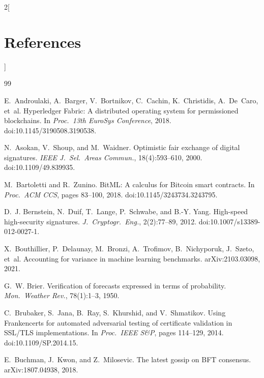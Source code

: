 \documentclass[10pt,a4paper]{article}
\theoremstyle{tight}
\begin{document}
\newpage
{\footnotesize
\setlength{\columnsep}{14pt}\setlength{\premulticols}{0pt}\setlength{\multicolsep}{2pt}
\begin{multicols}{2}[\section*{\large References}]
\renewcommand{\section}[2]{}%
\begin{thebibliography}{99}
\setlength{\itemsep}{0.5pt}\setlength{\parskip}{0pt}

 E.~Androulaki, A.~Barger, V.~Bortnikov, C.~Cachin, K.~Christidis, A.~De~Caro, et~al.
Hyperledger Fabric: A distributed operating system for permissioned blockchains. In \emph{Proc.\ 13th EuroSys
Conference}, 2018. doi:10.1145/3190508.3190538.

 N.~Asokan, V.~Shoup, and M.~Waidner. Optimistic fair exchange of digital signatures.
\emph{IEEE J.\ Sel.\ Areas Commun.}, 18(4):593--610, 2000. doi:10.1109/49.839935.

 M.~Bartoletti and R.~Zunino. BitML: A calculus for Bitcoin smart contracts. In
\emph{Proc.\ ACM CCS}, pages 83--100, 2018. doi:10.1145/3243734.3243795.

 D.~J. Bernstein, N.~Duif, T.~Lange, P.~Schwabe, and B.-Y. Yang. High-speed high-security
signatures. \emph{J.\ Cryptogr.\ Eng.}, 2(2):77--89, 2012. doi:10.1007/s13389-012-0027-1.

 X.~Bouthillier, P.~Delaunay, M.~Bronzi, A.~Trofimov, B.~Nichyporuk, J.~Szeto, et~al.
Accounting for variance in machine learning benchmarks. arXiv:2103.03098, 2021.

 G.~W. Brier. Verification of forecasts expressed in terms of probability. \emph{Mon.\ Weather
Rev.}, 78(1):1--3, 1950.

 C.~Brubaker, S.~Jana, B.~Ray, S.~Khurshid, and V.~Shmatikov. Using Frankencerts for automated
adversarial testing of certificate validation in SSL/TLS implementations. In \emph{Proc.\ IEEE S\&P}, pages 114--129, 2014. doi:10.1109/SP.2014.15.

 E.~Buchman, J.~Kwon, and Z.~Milosevic. The latest gossip on BFT consensus. arXiv:1807.04938,
2018.


\end{thebibliography}
\end{multicols}}
\end{document}
